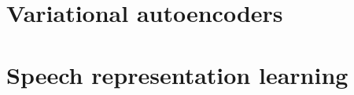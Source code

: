 






\section{Variational autoencoders}





\section{Speech representation learning}



\iffalse


